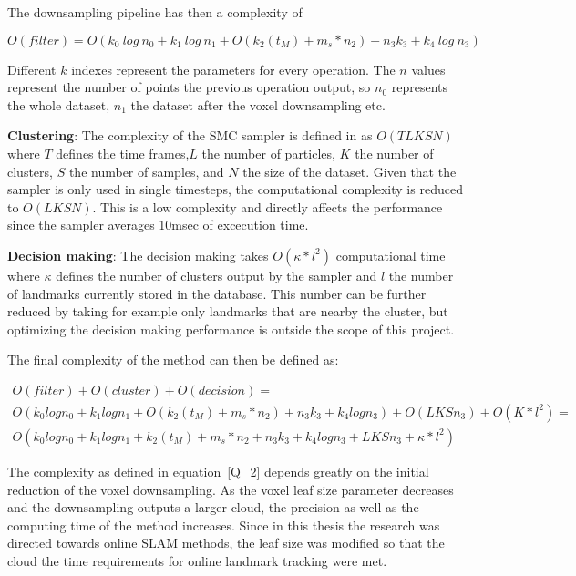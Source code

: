 \documentclass[twoside,hidelinks]{article}
\begin{document}
The downsampling pipeline has then a complexity of 

$$O(filter) = O(k_{0}\ log\ n_{0} + k_{1}\ log\ n_{1} + O(k_{2}(t_M)+ m_s*n_{2}) + n_{3}k_{3} + k_{4}\ log\ n_{3} ) $$

Different $k$ indexes represent the parameters for every operation. The $n$ values represent the number of points the previous operation output, so $n_0$ represents the whole dataset, $n_1$ the dataset after the voxel downsampling etc.

\textbf{Clustering}: The complexity of the SMC sampler is defined in \cite{smcddp} as $O(TLKSN)$ where $T$ defines the time frames,$L$ the number of particles, $K$ the number of clusters, $S$ the number of samples, and $N$ the size of the dataset. Given that the sampler is only used in single timesteps, the computational complexity is reduced to $ O(LKSN) $. This is a low complexity and directly affects the performance since the sampler averages 10msec of excecution time.

\textbf{Decision making}: The decision making takes $ O(\kappa * l^2) $ computational time where $\kappa$ defines the number of clusters output by the sampler and $l$ the number of landmarks currently stored in the database. This number can be further reduced by taking for example only landmarks that are nearby the cluster, but optimizing the decision making performance is outside the scope of this project.


The final complexity of the method can then be defined as:

\begin{equation} \label{Q_2}
\begin{split}
O(filter) + O(cluster) + O(decision) = \\
O(k_{0}logn_{0} + k_{1}logn_{1} + O(k_{2}(t_M)+ m_s*n_{2}) + n_{3}k_{3} + k_{4}logn_{3} ) + O(LKSn_3) + O(K * l^2)=\\
O(k_{0}logn_{0} + k_{1}logn_{1} + k_{2}(t_M)+ m_s*n_{2} + n_{3}k_{3} + k_{4}logn_{3} + LKSn_3 + \kappa * l^2)
\end{split}
\end{equation}

The complexity as defined in equation~\ref{Q_2} depends greatly on the initial reduction of the voxel downsampling. As the voxel leaf size parameter decreases and the downsampling outputs a larger cloud, the precision as well as the computing time of the method increases. Since in this thesis the research was directed towards online SLAM methods, the leaf size was modified so that the cloud the time requirements for online landmark tracking were met.
\end{document}
